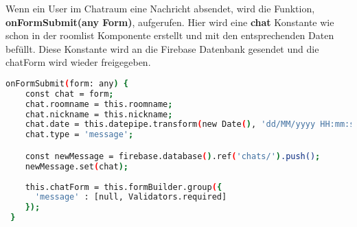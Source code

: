 Wenn ein User im Chatraum eine Nachricht absendet, wird die Funktion, \textbf{onFormSubmit(any Form)}, aufgerufen.
Hier wird eine \textbf{chat} Konstante wie schon in der roomlist Komponente erstellt und mit den entsprechenden Daten befüllt. Diese Konstante wird an die Firebase Datenbank gesendet und die chatForm
wird wieder freigegeben.

\begin{lstlisting}[language=bash]
onFormSubmit(form: any) {
    const chat = form;
    chat.roomname = this.roomname;
    chat.nickname = this.nickname;
    chat.date = this.datepipe.transform(new Date(), 'dd/MM/yyyy HH:mm:ss');
    chat.type = 'message';

    const newMessage = firebase.database().ref('chats/').push();
    newMessage.set(chat);
    
    this.chatForm = this.formBuilder.group({
      'message' : [null, Validators.required]
    });
 }
\end{lstlisting}

\newpage